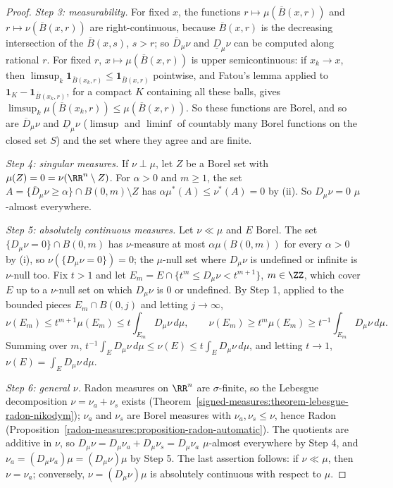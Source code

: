 \begin{proof}
\emph{Step 3: measurability.} For fixed $x$, the functions $r \mapsto \mu(\overline{B}(x, r))$ and $r \mapsto \nu(\overline{B}(x, r))$ are right-continuous, because $\overline{B}(x, r)$ is the decreasing
intersection of the $\overline{B}(x, s)$, $s > r$; so $\overline{D}_\mu\nu$ and $\underline{D}_\mu\nu$ can be computed along rational $r$. For fixed $r$, $x \mapsto \mu(\overline{B}(x, r))$ is upper
semicontinuous: if $x_k \to x$, then $\limsup_k\mathbf{1}_{\overline{B}(x_k, r)} \leq \mathbf{1}_{\overline{B}(x, r)}$ pointwise, and Fatou's lemma applied to $\mathbf{1}_K - \mathbf{1}_{\overline{B}(x_k, r)}$,
for a compact $K$ containing all these balls, gives $\limsup_k\mu(\overline{B}(x_k, r)) \leq \mu(\overline{B}(x, r))$. So these functions are Borel, and so are $\overline{D}_\mu\nu$ and $\underline{D}_\mu\nu$
($\limsup$ and $\liminf$ of countably many Borel functions on the closed set $S$) and the set where they agree and are finite.

\emph{Step 4: singular measures.} If $\nu \perp \mu$, let $Z$ be a Borel set with $\mu(Z) = 0 = \nu(\RR^n \setminus Z)$. For $\alpha > 0$ and $m \geq 1$, the set
$A = \{\overline{D}_\mu\nu \geq \alpha\} \cap B(0, m) \setminus Z$ has $\alpha\mu^*(A) \leq \nu^*(A) = 0$ by (ii). So $D_\mu\nu = 0$ $\mu$-almost everywhere.

\emph{Step 5: absolutely continuous measures.} Let $\nu \ll \mu$ and $E$ Borel. The set $\{D_\mu\nu = 0\} \cap B(0, m)$ has $\nu$-measure at most $\alpha\mu(B(0, m))$ for every $\alpha > 0$ by (i), so
$\nu(\{D_\mu\nu = 0\}) = 0$; the $\mu$-null set where $D_\mu\nu$ is undefined or infinite is $\nu$-null too. Fix $t > 1$ and let $E_m = E \cap \{t^m \leq D_\mu\nu < t^{m+1}\}$, $m \in \ZZ$, which
cover $E$ up to a $\nu$-null set on which $D_\mu\nu$ is $0$ or undefined. By Step 1, applied to the bounded pieces $E_m \cap B(0, j)$ and letting $j \to \infty$,
\[
\nu(E_m) \leq t^{m+1}\mu(E_m) \leq t\int_{E_m}D_\mu\nu\,d\mu, \qquad \nu(E_m) \geq t^m\mu(E_m) \geq t^{-1}\int_{E_m}D_\mu\nu\,d\mu .
\]
Summing over $m$, $t^{-1}\int_ED_\mu\nu\,d\mu \leq \nu(E) \leq t\int_ED_\mu\nu\,d\mu$, and letting $t \to 1$, $\nu(E) = \int_ED_\mu\nu\,d\mu$.

\emph{Step 6: general $\nu$.} Radon measures on $\RR^n$ are $\sigma$-finite, so the Lebesgue decomposition $\nu = \nu_a + \nu_s$ exists (Theorem~\ref{signed-measures:theorem-lebesgue-radon-nikodym}); $\nu_a$ and
$\nu_s$ are Borel measures with $\nu_a, \nu_s \leq \nu$, hence Radon (Proposition~\ref{radon-measures:proposition-radon-automatic}). The quotients are additive in $\nu$, so
$D_\mu\nu = D_\mu\nu_a + D_\mu\nu_s = D_\mu\nu_a$ $\mu$-almost everywhere by Step 4, and $\nu_a = (D_\mu\nu_a)\mu = (D_\mu\nu)\mu$ by Step 5. The last assertion follows: if $\nu \ll \mu$, then $\nu = \nu_a$;
conversely, $\nu = (D_\mu\nu)\mu$ is absolutely continuous with respect to $\mu$.
\end{proof}

